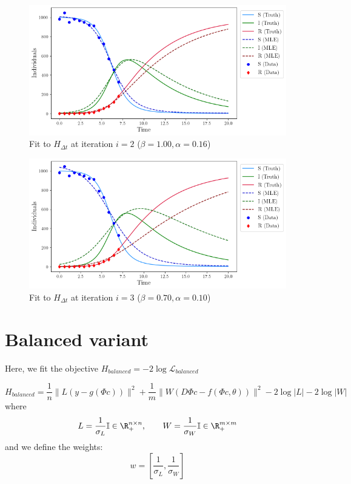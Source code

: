 \begin{figure}
\centering
\includegraphics{img/dtvariant_fit_iter2.png}
\caption{Fit to \(H_{\Delta t}\) at iteration \(i=2\)
(\(\beta=1.00, \alpha=0.16\))}
\end{figure}

\begin{figure}
\centering
\includegraphics{img/dtvariant_fit_iter3.png}
\caption{Fit to \(H_{\Delta t}\) at iteration \(i=3\)
(\(\beta=0.70, \alpha=0.10\))}
\end{figure}

\hypertarget{balanced-variant}{%
\section{Balanced variant}\label{balanced-variant}}

Here, we fit the objective
\(H_{balanced} = -2\log \mathcal{L}_{balanced}\)

\[
H_{balanced} = \frac{1}{n}\lVert L(y - g(\Phi c))\rVert^2 + \frac{1}{m}\lVert W(D\Phi c - f(\Phi c, \theta)) \rVert^2 - 2\log{|L|} - 2\log{|W|}
\] where
\[L = \frac{1}{\sigma_L} \mathbb{I}\in \R_+^{n\times n},\qquad W = \frac{1}{\sigma_W} \mathbb{I} \in \R_+^{m\times m}\]
and we define the weights:
\[w = \left[\frac{1}{\sigma_L}, \frac{1}{\sigma_W}\right]\]

